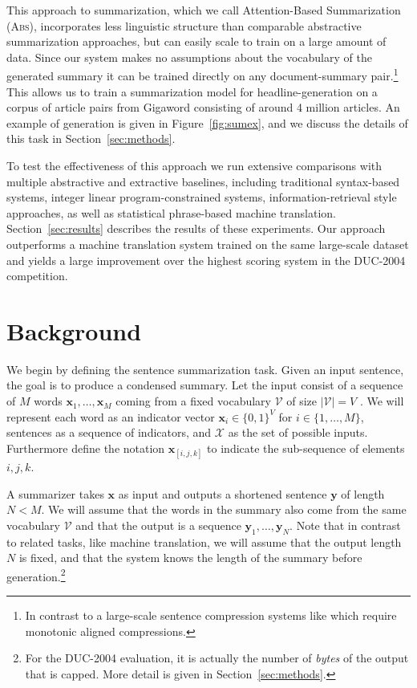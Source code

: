 \documentclass[11pt,a4paper]{article}
\newcommand{\xvec}{\mathbf{x}}
\newcommand{\yvec}{\mathbf{y}}
\newcommand{\mcV}{\mathcal{V}}
\begin{document}
This approach to summarization, which we call
Attention-Based Summarization (\textsc{Abs}), incorporates less linguistic structure than
comparable abstractive summarization approaches, but can easily scale to train on a
large amount of data. Since our system makes no assumptions about the
vocabulary of the generated summary it can be trained directly on any
document-summary pair.\footnote{In contrast to a large-scale sentence
compression systems like  which
require monotonic aligned compressions.} This allows us to train a
summarization model for headline-generation on a corpus of article
pairs from Gigaword \cite{graff2003english} consisting of around 4
million articles. An example of generation is given in Figure~\ref{fig:sumex}, and we discuss the details of this task in Section~\ref{sec:methods}.

To test the effectiveness of this approach we run extensive
comparisons with multiple abstractive and extractive baselines,
including traditional syntax-based systems, integer linear
program-constrained systems, information-retrieval style approaches,
as well as statistical phrase-based machine
translation. Section~\ref{sec:results} describes the results of these
experiments. Our approach outperforms a machine translation system
trained on the same large-scale dataset and yields a large
improvement over the highest scoring system in the DUC-2004
competition. 

\section{Background}
\label{sec:background}

We begin by defining the sentence summarization
task. Given
an input sentence, the goal is to produce a condensed summary. Let the
input consist of a sequence of $M$ words $\xvec_1, \ldots, \xvec_M$
coming from a fixed vocabulary $\mcV$ of size $|\mcV| = V$ . We
will represent each word as an indicator vector $\xvec_i \in \{0,
1\}^{V}$ for $i \in \{1,\ldots, M\}$, sentences as a sequence of
indicators, and $\mathcal{X}$ as the set of possible inputs.  Furthermore define the notation $\xvec_{[i,j,k]}$ to
indicate the sub-sequence of elements $i,j,k$.


A summarizer takes $\xvec$ as input and outputs a shortened sentence $\yvec$ of length $N
< M$. We will assume that the words in
the summary also come from the same vocabulary $\mcV$ and that the output is a sequence
$\yvec_1, \ldots, \yvec_N$. Note that in contrast to related tasks, like machine translation, we will  assume
that the output length $N$ is fixed, and that the system knows the length of the
summary before generation.\footnote{For the DUC-2004 evaluation, it is actually the number of \textit{bytes} of the output that is capped. More detail is given in Section~\ref{sec:methods}.}
\end{document}
